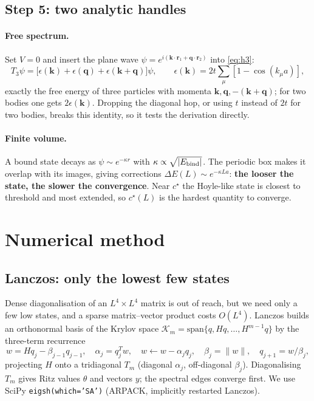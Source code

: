 \documentclass[11pt,a4paper]{article}
\newcommand{\rr}{\mathbf r}
\begin{document}
\subsection{Step 5: two analytic handles}\label{sec:analytic}
\paragraph{Free spectrum.} Set $V=0$ and insert the plane wave $\psi=e^{i(\mathbf k\cdot\rr_1+\mathbf q\cdot\rr_2)}$ into \eqref{eq:h3}:
\begin{equation}
T_3\psi=\big[\epsilon(\mathbf k)+\epsilon(\mathbf q)+\epsilon(\mathbf k+\mathbf q)\big]\psi,\qquad
\epsilon(\mathbf k)=2t\sum_{\mu}[1-\cos(k_\mu a)],
\end{equation}
exactly the free energy of three particles with momenta $\mathbf k,\mathbf q,-(\mathbf k+\mathbf q)$; for two bodies one gets $2\epsilon(\mathbf k)$.
Dropping the diagonal hop, or using $t$ instead of $2t$ for two bodies, breaks this identity, so it tests the derivation directly.

\paragraph{Finite volume.} A bound state decays as $\psi\sim e^{-\kappa r}$ with $\kappa\propto\sqrt{|E_{\rm bind}|}$.
The periodic box makes it overlap with its images, giving corrections $\Delta E(L)\sim e^{-\kappa La}$: \textbf{the looser the state, the slower the convergence}.
Near $c^\star$ the Hoyle-like state is closest to threshold and most extended, so $c^\star(L)$ is the hardest quantity to converge.

\section{Numerical method}

\subsection{Lanczos: only the lowest few states}
Dense diagonalisation of an $L^4\times L^4$ matrix is out of reach, but we need only a few low states, and a sparse matrix--vector product costs $O(L^4)$.
Lanczos builds an orthonormal basis of the Krylov space $\mathcal K_m=\mathrm{span}\{q,Hq,\dots,H^{m-1}q\}$ by the three-term recurrence
\begin{equation}
w=Hq_j-\beta_{j-1}q_{j-1},\quad \alpha_j=q_j^Tw,\quad w\leftarrow w-\alpha_jq_j,\quad \beta_j=\|w\|,\quad q_{j+1}=w/\beta_j,
\end{equation}
projecting $H$ onto a tridiagonal $T_m$ (diagonal $\alpha_j$, off-diagonal $\beta_j$). Diagonalising $T_m$ gives Ritz values $\theta$ and vectors $y$; the spectral edges converge first.
We use SciPy \texttt{eigsh(which='SA')} (ARPACK, implicitly restarted Lanczos).
\end{document}

